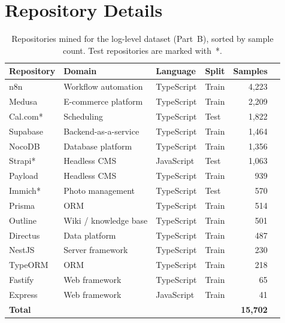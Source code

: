 \documentclass[10pt,twocolumn]{article}
\begin{document}
\onecolumn
\appendix
\section{Repository Details}

\begin{table}[h]
  \centering
  \caption{Repositories mined for the log-level dataset (Part~B), sorted by sample count. Test repositories are marked with~*.}
  \label{tab:repos}
  \begin{tabular}{llllrl}
    \toprule
    Repository & Domain & Language & Split & Samples \\
    \midrule
    n8n & Workflow automation & TypeScript & Train & 4,223 \\
    Medusa & E-commerce platform & TypeScript & Train & 2,209 \\
    Cal.com* & Scheduling & TypeScript & Test & 1,822 \\
    Supabase & Backend-as-a-service & TypeScript & Train & 1,464 \\
    NocoDB & Database platform & TypeScript & Train & 1,356 \\
    Strapi* & Headless CMS & JavaScript & Test & 1,063 \\
    Payload & Headless CMS & TypeScript & Train & 939 \\
    Immich* & Photo management & TypeScript & Test & 570 \\
    Prisma & ORM & TypeScript & Train & 514 \\
    Outline & Wiki / knowledge base & TypeScript & Train & 501 \\
    Directus & Data platform & TypeScript & Train & 487 \\
    NestJS & Server framework & TypeScript & Train & 230 \\
    TypeORM & ORM & TypeScript & Train & 218 \\
    Fastify & Web framework & TypeScript & Train & 65 \\
    Express & Web framework & JavaScript & Train & 41 \\
    \midrule
    \textbf{Total} & & & & \textbf{15,702} \\
    \bottomrule
  \end{tabular}
\end{table}
\end{document}
